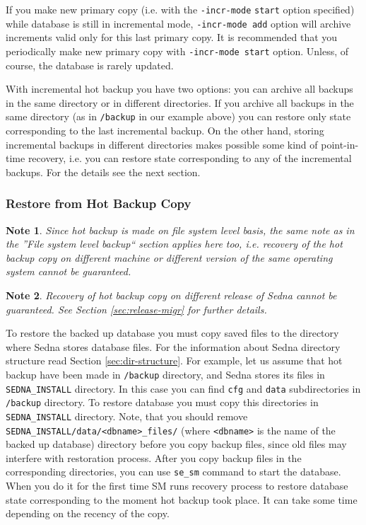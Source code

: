 \documentclass[a4paper,12pt]{article}
\newtheorem{note}{Note}
\begin{document}
If you make new primary copy (i.e. with the \verb!-incr-mode! \verb!start! option specified) while database is still in incremental mode,
\verb!-incr-mode add! option will archive increments valid only for this last primary copy. It is recommended that you periodically make new primary copy with \verb!-incr-mode start! option. Unless,
of course, the database is rarely updated.

With incremental hot backup you have two options: you can archive all backups in the same directory or in different directories.
If you archive all backups in the same directory (as in \verb!/backup! in our example above) you can restore only state
corresponding to the last incremental backup. On the other hand, storing incremental backups in different directories makes possible
some kind of point-in-time recovery, i.e. you can restore state corresponding to any of the incremental backups. For the details
see the next section.

\subsubsection*{Restore from Hot Backup Copy}

\begin{note}
Since hot backup is made on file system level basis, the same note as in the ''File system level backup``
section applies here too, i.e. recovery of the hot backup copy on different machine or different version of the same operating
system cannot be guaranteed.
\end{note}

\begin{note}
Recovery of hot backup copy on different release of Sedna cannot be guaranteed. See Section \ref{sec:release-migr} for
further details.
\end{note}

To restore the backed up database you must copy saved files to the directory where Sedna stores database files.
For the information about Sedna directory structure read Section \ref{sec:dir-structure}. For example, let us assume that
hot backup have been made in \verb!/backup! directory, and Sedna stores its files in \verb!SEDNA_INSTALL! directory.
In this case you can find \verb!cfg! and \verb!data! subdirectories in \verb!/backup! directory.
To restore database you must copy this directories in \verb!SEDNA_INSTALL! directory.
Note, that you should remove \verb!SEDNA_INSTALL/data/<dbname>_files/! (where \verb!<dbname>! is the name
of the backed up database) directory before you copy backup files, since
old files may interfere with restoration process. After you copy backup files in the corresponding directories, you can
use \verb!se_sm! command to start the database. When you do it for the first time SM runs recovery process to restore
database state corresponding to the moment hot backup took place. It can take some time depending on the recency of the copy.
\end{document}
